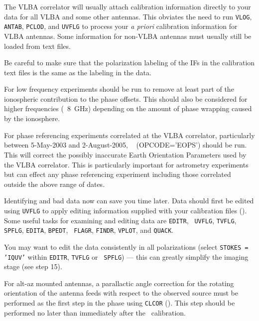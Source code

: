 The VLBA correlator will usually attach
calibration information directly to your data for all VLBA and some
other antennas.  This obviates the need to run {\tt VLOG}, {\tt
ANTAB}, {\tt PCLOD}, and {\tt UVFLG} to process your {\it a priori\/}
calibration information for VLBA antennas.  Some information for
non-VLBA antennas must usually still be loaded from text files.

Be careful to make sure that the polarization labeling of the IFs in
the calibration text files is the same as the labeling in the data.

For low frequency experiments {\tt {}} should be run to
remove at least part of the ionospheric contribution to the phase
offsets.  This should also be considered for higher frequencies
(\eg\ 8~GHz) depending on the amount of phase wrapping caused by the
ionosphere.

For phase referencing experiments correlated at the VLBA correlator,
particularly between 5-May-2003 and 2-August-2005, {\tt
{}} (OPCODE='EOPS') should be run.  This will correct the
possibly inaccurate Earth Orientation Parameters used by the VLBA
correlator.  This is particularly important for astrometry experiments
but can effect any phase referencing experiment including those
correlated outside the above range of dates.

Identifying and  bad data now can save you time later.
Data should first be edited using {\tt UVFLG} to apply editing
information supplied with your calibration files ().
Some useful tasks for examining and editing data are {\tt EDITR}, {\tt
UVFLG}, {\tt TVFLG}, {\tt SPFLG}, {\tt EDITA}, {\tt BPEDT}, {\tt
FLAGR}, {\tt FINDR}, {\tt VPLOT}, and {\tt QUACK}\@.

You may want to edit the data consistently in all polarizations
(select {\tt STOKES = 'IQUV'} within {\tt EDITR}, {\tt TVFLG} or {\tt
SPFLG}) --- this can greatly simplify the imaging stage (see step 15).

For alt-az mounted antennas, a parallactic angle correction for the
rotating orientation of the antenna feeds with respect to the observed
source must be performed as the first step in the phase
 using {\tt CLCOR} ().
This step should be performed no later than immediately after the
\Tsys\ calibration.

